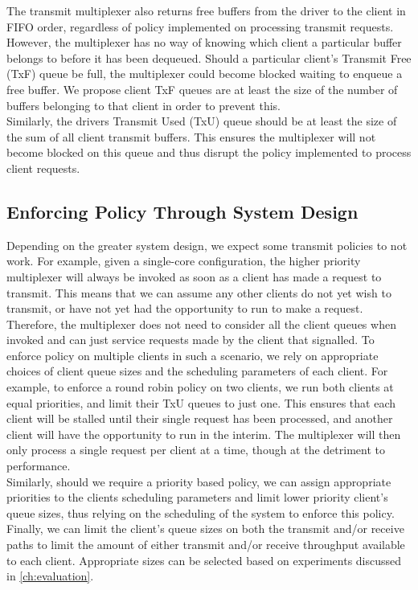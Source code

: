 The transmit multiplexer also returns
free buffers from the driver to the client in FIFO order, regardless of policy implemented on
processing transmit requests. However, the multiplexer has no way of knowing which client
a particular buffer belongs to before it has been dequeued. Should a particular client's 
Transmit Free (TxF) queue be full, the multiplexer could become blocked waiting to enqueue
a free buffer. We propose client TxF queues are at least 
the size of the number of buffers belonging to that client in order to prevent this. \\ 
Similarly, the drivers Transmit Used (TxU) queue should be at least the size of the sum of 
all client transmit buffers. This ensures the multiplexer will not become blocked on this queue
and thus disrupt the policy implemented to process client requests. \\ 

\subsection{Enforcing Policy Through System Design}
Depending on the greater system design, we expect some transmit policies to not work.
For example, given a single-core configuration, the higher priority multiplexer will
always be invoked as soon as a client has made a request to transmit. This means that
we can assume any other clients do not yet wish to transmit, or have not yet had the
opportunity to run to make a request. Therefore, the multiplexer does not need to 
consider all the client queues when invoked and can just service requests made
by the client that signalled. To enforce policy on multiple clients in such a scenario,
we rely on appropriate choices of client queue sizes and the scheduling parameters
of each client. For example, to enforce a round robin policy on two clients, we run both clients
at equal priorities, and limit their TxU queues to just one. This ensures
that each client will be stalled until their single request has been processed, and
another client will have the opportunity to run in the interim. The multiplexer will
then only process a single request per client at a time, though at the detriment to performance.\\
Similarly, should we require a priority based policy, we can assign appropriate priorities
to the clients scheduling parameters and limit lower priority client's queue sizes, thus relying on the scheduling
of the system to enforce this policy.\\
Finally, we can limit the client's queue sizes on both the transmit and/or receive paths
to limit the amount of either transmit and/or receive throughput available to each client.
Appropriate sizes can be selected based on experiments discussed in \autoref{ch:evaluation}.\\ 

